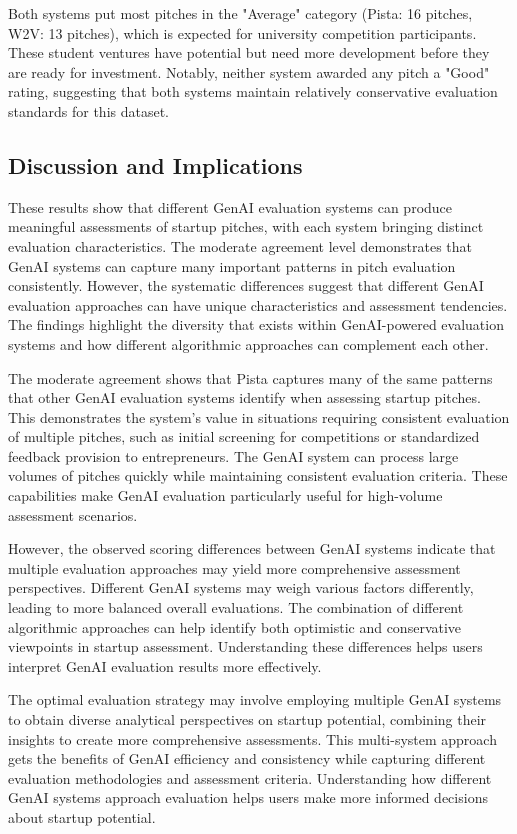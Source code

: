 Both systems put most pitches in the "Average" category (Pista: 16 pitches, W2V: 13 pitches), which is expected for university competition participants. These student ventures have potential but need more development before they are ready for investment. Notably, neither system awarded any pitch a "Good" rating, suggesting that both systems maintain relatively conservative evaluation standards for this dataset.


\subsection{Discussion and Implications}

These results show that different GenAI evaluation systems can produce meaningful assessments of startup pitches, with each system bringing distinct evaluation characteristics. The moderate agreement level demonstrates that GenAI systems can capture many important patterns in pitch evaluation consistently. However, the systematic differences suggest that different GenAI evaluation approaches can have unique characteristics and assessment tendencies. The findings highlight the diversity that exists within GenAI-powered evaluation systems and how different algorithmic approaches can complement each other.

The moderate agreement shows that Pista captures many of the same patterns that other GenAI evaluation systems identify when assessing startup pitches. This demonstrates the system's value in situations requiring consistent evaluation of multiple pitches, such as initial screening for competitions or standardized feedback provision to entrepreneurs. The GenAI system can process large volumes of pitches quickly while maintaining consistent evaluation criteria. These capabilities make GenAI evaluation particularly useful for high-volume assessment scenarios.

However, the observed scoring differences between GenAI systems indicate that multiple evaluation approaches may yield more comprehensive assessment perspectives. Different GenAI systems may weigh various factors differently, leading to more balanced overall evaluations. The combination of different algorithmic approaches can help identify both optimistic and conservative viewpoints in startup assessment. Understanding these differences helps users interpret GenAI evaluation results more effectively.

The optimal evaluation strategy may involve employing multiple GenAI systems to obtain diverse analytical perspectives on startup potential, combining their insights to create more comprehensive assessments. This multi-system approach gets the benefits of GenAI efficiency and consistency while capturing different evaluation methodologies and assessment criteria. Understanding how different GenAI systems approach evaluation helps users make more informed decisions about startup potential.